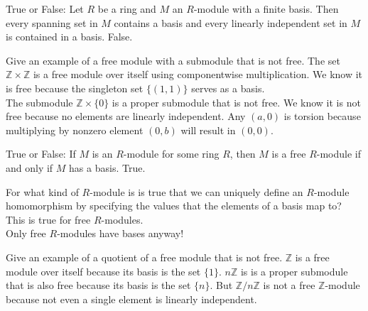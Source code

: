 \documentclass[avery5371,grid]{flashcards}
\newcommand{\Z}{\mathbb{Z}}
\begin{document}
\begin{flashcard}[Modules]{True or False: Let $R$ be a ring and $M$ an $R$-module with a finite basis. Then every spanning set in $M$ contains a basis and every linearly independent set in $M$ is contained in a basis.}
 False. \\
\end{flashcard}

\begin{flashcard}[Modules]{Give an example of a free module with a submodule that is not free.}
 The set $\Z \times \Z$ is a free module over itself using componentwise multiplication. We know it is free because the singleton set $\{(1,1)\}$ serves as a basis.\\
 
 The submodule $\Z \times \{0\}$ is a proper submodule that is not free. We know it is not free because no elements are linearly independent. Any $(a,0)$ is torsion because multiplying by nonzero element $(0,b)$ will result in $(0,0)$.
\end{flashcard}

\begin{flashcard}[Modules]{True or False: If $M$ is an $R$-module for some ring $R$, then $M$ is a free $R$-module if and only if $M$ has a basis.}
 True.
\end{flashcard}

\begin{flashcard}[Modules]{For what kind of $R$-module is is true that we can uniquely define an $R$-module homomorphism by specifying the values that the elements of a basis map to?}
 This is true for free $R$-modules. \\
 
 Only free $R$-modules have bases anyway!
\end{flashcard}

\begin{flashcard}[Modules]{Give an example of a quotient of a free module that is not free.}
 $\Z$ is a free module over itself because its basis is the set $\{1\}$. $n\Z$ is is a proper submodule that is also free because its basis is the set $\{n\}$. But $\Z/n\Z$ is not a free $\Z$-module because not even a single element is linearly independent.
\end{flashcard}
\end{document}
